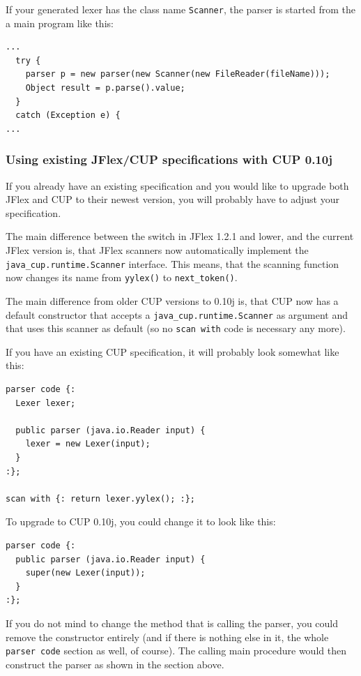 \documentclass[11pt]{scrartcl}
\newcommand{\xsmall}{}
\begin{document}
If your generated lexer has the class name \texttt{Scanner}, the parser
is started from the a main program like this:

{\xsmall\begin{verbatim}
...
  try {
    parser p = new parser(new Scanner(new FileReader(fileName)));
    Object result = p.parse().value;
  }
  catch (Exception e) {
...
\end{verbatim}
}

\subsubsection{Using existing JFlex/CUP specifications with CUP 0.10j}
If you already have an existing specification and you would like to upgrade
both JFlex and CUP to their newest version, you will probably have to adjust
your specification.

The main difference between the \texttt{} switch in
JFlex 1.2.1 and lower, and the current JFlex version is, that JFlex scanners
now automatically implement the \texttt{java\_cup.runtime.Scanner} interface.
This means, that the scanning function now changes its name from \texttt{yylex()}
to \texttt{next\_token()}. 

The main difference from older CUP versions to 0.10j is, that CUP now
has a default constructor that accepts a \texttt{java\_cup.runtime.Scanner} 
as argument and that uses this scanner as
default (so no \texttt{scan with} code is necessary any more).

If you have an existing CUP specification, it will probably look somewhat like this:
{\xsmall\begin{verbatim}
parser code {:
  Lexer lexer;

  public parser (java.io.Reader input) {
    lexer = new Lexer(input);
  }
:};

scan with {: return lexer.yylex(); :};
\end{verbatim}
}

To upgrade to CUP 0.10j, you could change it to look like this:
{\xsmall\begin{verbatim}
parser code {:
  public parser (java.io.Reader input) {
    super(new Lexer(input));
  }
:};
\end{verbatim}
}

If you do not mind to change the method that is calling the parser,
you could remove the constructor entirely (and if there is nothing else
in it, the whole \texttt{parser code} section as well, of course). The calling
main procedure would then construct the parser as shown in the section above.
\end{document}
